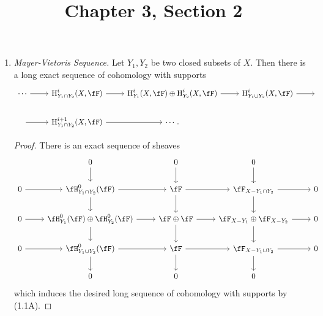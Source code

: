 \documentclass[a4paper]{article}
\title{Chapter 3, Section 2}
\begin{document}
\maketitle

\begin{enumerate} [label=\textbf{\arabic*.}, leftmargin=0em]

    \item[\textbf{4.}] \textit{Mayer-Vietoris Sequence.} Let $Y_1, Y_2$ be two closed subsets of $X$. Then there is a long exact sequence of cohomology with supports
          \[ \begin{tikzcd}
                  \cdots \arrow[r] & {\cH^i_{Y_1 \cap Y_2}(X, \fF)} \arrow[r]       & {\cH_{Y_1}^i(X, \fF) \oplus \cH_{Y_2}^i(X, \fF)} \arrow[r] & {\cH^i_{Y_1 \cup Y_2}(X, \fF)} \arrow[r] & {} \\
                  {} \arrow[r]     & {\cH^{i + 1}_{Y_1 \cap Y_2}(X, \fF)} \arrow[r] & \cdots .                                               &                                        &
              \end{tikzcd} \]

          \begin{proof}
              There is an exact sequence of sheaves
              \[ \begin{tikzcd}
                      & 0 \arrow[d]                                                  & 0 \arrow[d]                        & 0 \arrow[d]                                            &   \\
                      0 \arrow[r] & \fH^0_{Y_1 \cap Y_2}(\fF) \arrow[r] \arrow[d]                & \fF \arrow[r] \arrow[d]            & \fF_{X - Y_1 \cap Y_2} \arrow[r] \arrow[d]             & 0 \\
                      0 \arrow[r] & \fH_{Y_1}^0(\fF) \oplus \fH_{Y_2}^0(\fF) \arrow[d] \arrow[r] & \fF \oplus \fF \arrow[d] \arrow[r] & \fF_{X - Y_1} \oplus \fF_{X - Y_2} \arrow[d] \arrow[r] & 0 \\
                      0 \arrow[r] & \fH^0_{Y_1 \cup Y_2}(\fF) \arrow[d] \arrow[r]                & \fF \arrow[d] \arrow[r]            & \fF_{X - Y_1 \cup Y_2} \arrow[d] \arrow[r]             & 0 \\
                      & 0                                                            & 0                                  & 0                                                      &
                  \end{tikzcd} \]
              which induces the desired long sequence of cohomology with supports by (1.1A).
          \end{proof}


\end{enumerate}
\end{document}
